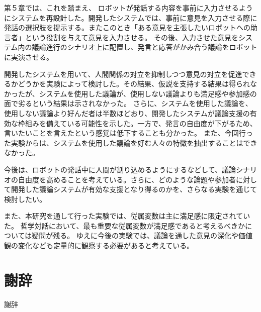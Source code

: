 \documentclass[11pt, a4paper]{jreport} %
\begin{document}
第５章では、これを踏まえ、
ロボットが発話する内容を事前に入力させるようにシステムを再設計した。開発したシステムでは、事前に意見を入力させる際に発話の選択肢を提示する。またこのとき「ある意見を主張したいロボットへの助言者」という役割を与えて意見を入力させる。
その後、入力させた意見をシステム内の議論進行のシナリオ上に配置し、発言と応答がかみ合う議論をロボットに実演させる。




開発したシステムを用いて、人間関係の対立を抑制しつつ意見の対立を促進できるかどうかを実験によって検討した。その結果、仮説を支持する結果は得られなかったが、システムを使用した議論が、使用しない議論よりも満足感や参加感の面で劣るという結果は示されなかった。
さらに、システムを使用した議論を、使用しない議論より好んだ者は半数ほどおり、開発したシステムが議論支援の有効な枠組みを備えている可能性を示した。一方で、発言の自由度が下がるため、言いたいことを言えたという感覚は低下することも分かった。%
また、今回行った実験からは、システムを使用した議論を好む人々の特徴を抽出することはできなかった。


今後は、ロボットの発話中に人間が割り込めるようにするなどして、議論シナリオの自由度を高めることを考えている。さらに、どのような論題や参加者に対して開発した議論システムが有効な支援となり得るのかを、さらなる実験を通じて検討したい。



また、本研究を通して行った実験では、従属変数は主に満足感に限定されていた。
哲学対話において、最も重要な従属変数が満足感であると考えるべきかについては疑問が残る。
ゆえに今後の実験では、議論を通した意見の深化や価値観の変化なども定量的に観察する必要があると考えている。





\chapter*{謝辞}
謝辞
\end{document}
